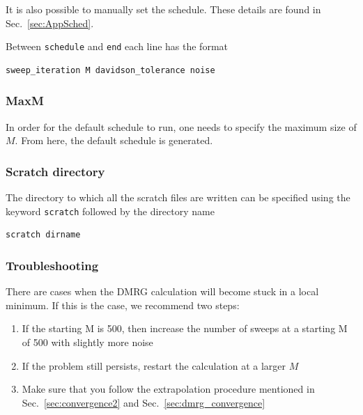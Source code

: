 \documentclass[letterpaper,12pt,aps, pra]{revtex4-1}
\begin{document}
It is also possible to manually set the schedule. These details are found in 
Sec.~\ref{sec:AppSched}.

Between \texttt{schedule} and \texttt{end} each line
has the format
\begin{verbatim}
sweep_iteration M davidson_tolerance noise
\end{verbatim}

\subsubsection{MaxM}
In order for the default schedule to run, one needs to specify the maximum size of $M$. From here, the default schedule is generated.

\subsubsection{Scratch directory}
The directory to which all the scratch files are written can be specified using
the keyword \texttt{scratch}  followed by the directory name
\begin{verbatim}
scratch dirname
\end{verbatim}

\subsubsection{Troubleshooting}
There are cases when the DMRG calculation will become stuck in a local minimum.
If this is the case, we recommend two steps:
\begin{enumerate}
	\item If the starting M is 500, then increase the number of sweeps at a starting M of 500 with slightly more noise
	\item If the problem still persists, restart the calculation at a larger $M$
	\item Make sure that you follow the extrapolation procedure mentioned in
		Sec.~\ref{sec:convergence2} and Sec.~\ref{sec:dmrg_convergence}
\end{enumerate}
\end{document}
